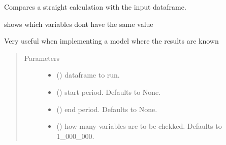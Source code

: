 \documentclass[letterpaper,10pt,english]{sphinxmanual}
\begin{document}
\begin{fulllineitems}
\begin{fulllineitems}
\label{\detokenize{index:modelclass.Model_help_Mixin.test_model}}
\pysigstartsignatures
{}
\pysigstopsignatures
\sphinxAtStartPar
Compares a straight calculation with the input dataframe.

\sphinxAtStartPar
shows which variables dont have the same value

\sphinxAtStartPar
Very useful when implementing a model where the results are known
\begin{quote}\begin{description}
\item[{Parameters}] \leavevmode\begin{itemize}
\item {} 
\sphinxAtStartPar
{} () \textendash{} dataframe to run.

\item {} 
\sphinxAtStartPar
{} (\sphinxstyleliteralemphasis{\sphinxupquote{, }}) \textendash{} start period. Defaults to None.

\item {} 
\sphinxAtStartPar
{} (\sphinxstyleliteralemphasis{\sphinxupquote{, }}) \textendash{} end period. Defaults to None.

\item {} 
\sphinxAtStartPar
{} (\sphinxstyleliteralemphasis{\sphinxupquote{, }}) \textendash{} how many variables are to be chekked. Defaults to 1\_000\_000.


\end{itemize}
\end{description}
\end{quote}
\end{fulllineitems}
\end{fulllineitems}
\end{document}
